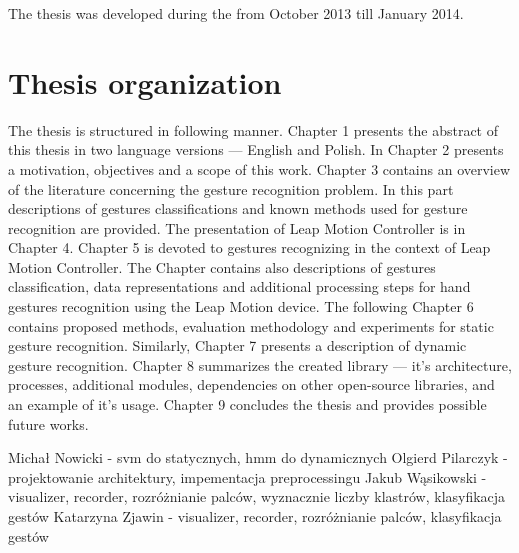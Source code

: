 The thesis was developed during the from October 2013 till January 2014.


\section{Thesis organization}
The thesis is structured in following manner. 
Chapter 1 presents the abstract of this thesis in two language versions --- English and Polish. 
In Chapter 2 presents a motivation, objectives and a scope of this work. 
Chapter 3 contains an overview of the literature concerning the gesture recognition problem. 
In this part descriptions of gestures classifications and known methods used for gesture recognition are provided. 
The presentation of Leap Motion Controller is in Chapter 4. Chapter 5 is devoted to gestures recognizing in the context of Leap Motion Controller.
The Chapter contains also descriptions of gestures classification, data representations and additional processing steps for hand gestures recognition using the Leap Motion device. 
The following Chapter 6 contains proposed methods, evaluation methodology and experiments for static gesture recognition. 
Similarly, Chapter 7 presents a description of dynamic gesture recognition. 
Chapter 8 summarizes the created library --- it's architecture, processes, additional modules, dependencies on other open-source libraries, and an example of it's usage. 
Chapter 9 concludes the thesis and provides possible future works. 

{\color{red} Michał Nowicki - svm do statycznych, hmm do dynamicznych
Olgierd Pilarczyk - projektowanie architektury, impementacja preprocessingu
Jakub Wąsikowski - visualizer, recorder, rozróżnianie palców, wyznacznie liczby klastrów, klasyfikacja gestów
Katarzyna Zjawin - visualizer, recorder, rozróżnianie palców, klasyfikacja gestów}



